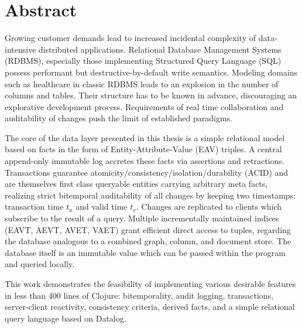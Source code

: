 \cleardoublepage{}

\section*{Abstract}

Growing customer demands lead to increased incidental complexity of data-intensive distributed applications. Relational Database Management Systems (RDBMS), especially those implementing Structured Query Language (SQL) possess performant but destructive-by-default write semantics. Modeling domains such as healthcare in classic RDBMS leads to an explosion in the number of columns and tables. Their structure has to be known in advance, discouraging an explorative development process. Requirements of real time collaboration and auditability of changes push the limit of established paradigms.

The core of the data layer presented in this thesis is a simple relational model based on facts in the form of Entity-Attribute-Value (EAV) triples. A central append-only immutable log accretes these facts via assertions and retractions. Transactions guarantee atomicity/consistency/isolation/durability (ACID) and are themselves first class queryable entities carrying arbitrary meta facts, realizing strict bitemporal auditability of all changes by keeping two timestamps: transaction time $t_x$ and valid time $t_v$. Changes are replicated to clients which subscribe to the result of a query. Multiple incrementally maintained indices (EAVT, AEVT, AVET, VAET) grant efficient direct access to tuples, regarding the database analogous to a combined graph, column, and document store. The database itself is an immutable value which can be passed within the program and queried locally. 

This work demonstrates the feasibility of implementing various desirable features in less than 400 lines of Clojure: bitemporality, audit logging, transactions, server-client reactivity, consistency criteria, derived facts, and a simple relational query language based on Datalog.
